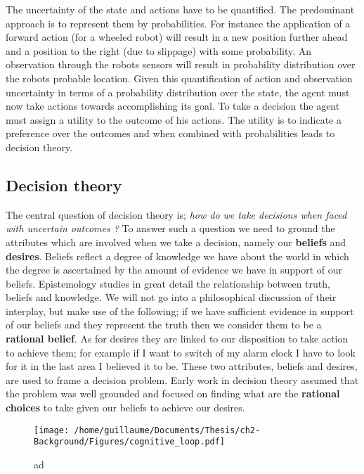 The uncertainty of the state and actions have to be quantified. The predominant approach 
is to  represent them by probabilities. For instance the application of a forward action (for a wheeled robot) 
will result in a new position further ahead and a position to the right (due to slippage) with some probability.
An observation through the robots sensors will result in probability distribution over the robots probable location.
Given this quantification of action and observation uncertainty in terms of a probability distribution over the state, 
the agent must now take actions towards accomplishing its goal. To take a decision the agent must assign a utility 
to the outcome of his actions. The utility is to indicate a preference over the outcomes and when combined with 
probabilities leads to decision theory. 

\subsection{Decision theory}

The central question of decision theory is; \textit{how do we take decisions when faced with uncertain outcomes ?} To answer
such a question we need to ground the attributes which are involved when we take a decision, namely our \textbf{beliefs} and 
\textbf{desires}. Beliefs reflect a degree of knowledge we have about the world in which the degree is ascertained by 
the amount of evidence we have in support of our beliefs. Epistemology studies in great detail the relationship between 
truth, beliefs and knowledge. We will not go into a philosophical discussion of their interplay, but make use of the following; 
if we have sufficient evidence in support of our beliefs and they represent the truth then we consider them to 
be a \textbf{rational belief}. As for desires they are linked to our disposition to take action to achieve them; for 
example if I want to switch of my alarm clock I have to look for it in the last area I believed it to be. 
These two attributes, beliefs and desires, are used to frame a decision problem. Early work in decision theory assumed 
that the problem was well grounded and focused on finding what are the \textbf{rational choices} to take given our beliefs 
to achieve our desires. 

\begin{figure}[h]
 \centering
 \texttt{[image: /home/guillaume/Documents/Thesis/ch2-Background/Figures/cognitive\_loop.pdf]}
  \caption{ad}
\end{figure}


